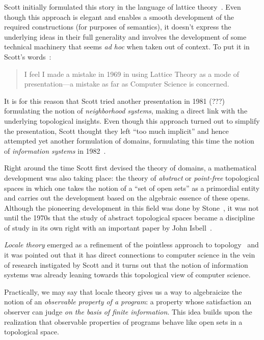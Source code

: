 \documentclass{article}
\begin{document}
Scott initially formulated this story in the language of lattice
theory~\cite{birkhoff:1940}. Even though this approach is elegant and enables a smooth
development of the required constructions (for purposes of semantics), it doesn't express
the underlying ideas in their full generality and involves the development of some
technical machinery that seems \emph{ad hoc} when taken out of context. To put it in
Scott's words~\cite[pg.~577]{scott:1982}:

\begin{quote}
  I feel I made a mistake in 1969 in using Lattice Theory as a mode of
  presentation---a mistake as far as Computer Science is concerned.
\end{quote}

It is for this reason that Scott tried another presentation in 1981 (???) formulating the
notion of \emph{neighborhood systems}, making a direct link with the underlying
topological insights. Even though this approach turned out to simplify the presentation,
Scott thought they left ``too much implicit'' and hence attempted yet another formulation
of domains, formulating this time the notion of \emph{information systems} in
1982~\cite{scott:1982}.

Right around the time Scott first devised the theory of domains, a mathematical
development was also taking place: the theory of \emph{abstract} or \emph{point-free}
topological spaces in which one takes the notion of a ``set of open sets'' as a primordial
entity and carries out the development based on the algebraic essence of these opens.
Although the pioneering development in this field was done by Stone~\cite{stone:1934}, it
was not until the 1970s that the study of abstract topological spaces became a discipline
of study in its own right with an important paper by John Isbell~\cite{isbell:1973}.

\emph{Locale theory} emerged as a refinement of the pointless approach to topology~\cite{
  johnstone:1982} and it was pointed out that it has direct connections to computer
science in the vein of research instigated by Scott and it turns out that the notion of
information systems was already leaning towards this topological view of computer science.

Practically, we may say that locale theory gives us a way to algebraicize the notion of an
\emph{observable property of a program}: a property whose satisfaction an observer can
judge \emph{on the basis of finite information}. This idea builds upon the realization
that observable properties of programs behave like open sets in a topological space.
\end{document}
